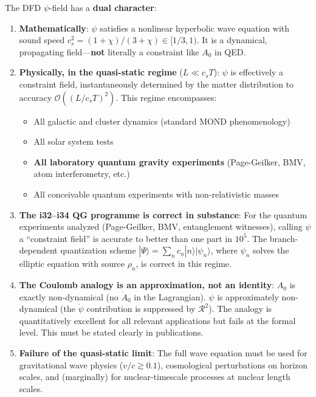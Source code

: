 \documentclass[12pt,a4paper]{article}
\newcommand{\order}[1]{\mathcal{O}(#1)}
\begin{document}
\begin{tcolorbox}[colback=red!5!white, colframe=red!60!black,
title=Corrected Statement (Replaces the i32--i34 Characterization)]

The DFD $\psi$-field has a \textbf{dual character}:

\begin{enumerate}
\item \textbf{Mathematically}: $\psi$ satisfies a nonlinear hyperbolic wave
equation with sound speed $c_s^2 = (1+\chi)/(3+\chi) \in [1/3, 1)$.
It is a dynamical, propagating field---\textbf{not} literally a constraint
like $A_0$ in QED.

\item \textbf{Physically, in the quasi-static regime} ($L \ll c_s T$):
$\psi$ is effectively a constraint field, instantaneously determined by
the matter distribution to accuracy $\order{(L/c_s T)^2}$. This regime
encompasses:
\begin{itemize}
\item All galactic and cluster dynamics (standard MOND phenomenology)
\item All solar system tests
\item \textbf{All laboratory quantum gravity experiments} (Page-Geilker,
BMV, atom interferometry, etc.)
\item All conceivable quantum experiments with non-relativistic masses
\end{itemize}

\item \textbf{The i32--i34 QG programme is correct in substance}: For the
quantum experiments analyzed (Page-Geilker, BMV, entanglement witnesses),
calling $\psi$ a ``constraint field'' is accurate to better than one
part in $10^5$. The branch-dependent quantization scheme
$|\Psi\rangle = \sum_n c_n |n\rangle|\psi_n\rangle$, where $\psi_n$
solves the elliptic equation with source $\rho_n$, is correct in this
regime.

\item \textbf{The Coulomb analogy is an approximation, not an identity}:
$A_0$ is exactly non-dynamical (no $\dot{A}_0$ in the Lagrangian).
$\psi$ is approximately non-dynamical (the $\dot\psi$ contribution is
suppressed by $\mathcal{R}^2$). The analogy is quantitatively excellent
for all relevant applications but fails at the formal level. This must
be stated clearly in publications.

\item \textbf{Failure of the quasi-static limit}: The full wave equation
must be used for gravitational wave physics ($v/c \gtrsim 0.1$),
cosmological perturbations on horizon scales, and (marginally) for
nuclear-timescale processes at nuclear length scales.
\end{enumerate}
\end{tcolorbox}
\end{document}
